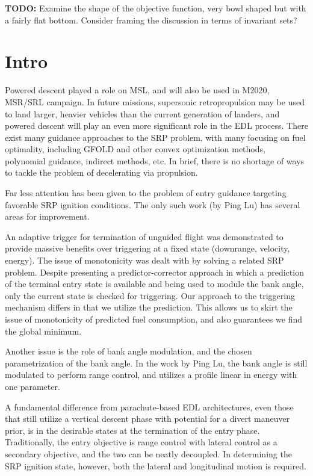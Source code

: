 \documentclass[]{article}
\begin{document}
\textbf{TODO:} Examine the shape of the objective function, very bowl shaped but with a fairly flat bottom. Consider framing the discussion in terms of invariant sets? 

\section{Intro}
Powered descent played a role on MSL, and will also be used in M2020, MSR/SRL campaign. In future missions, supersonic retropropulsion may be used to land larger, heavier vehicles than the current generation of landers, and powered descent will play an even more significant role in the EDL process. There exist many guidance approaches to the SRP problem, with many focusing on fuel optimality, including GFOLD and other convex optimization methods, polynomial guidance, indirect methods, etc. In brief, there is no shortage of ways to tackle the problem of decelerating via propulsion. 

Far less attention has been given to the problem of entry guidance targeting favorable SRP ignition conditions. The only such work (by Ping Lu) has several areas for improvement. 

An adaptive trigger for termination of unguided flight was demonstrated to provide massive benefits over triggering at a fixed state (downrange, velocity, energy). The issue of monotonicity was dealt with by solving a related SRP problem. Despite presenting a predictor-corrector approach in which a prediction of the terminal entry state is available and being used to module the bank angle, only the current state is checked for triggering. Our approach to the triggering mechanism differs in that we utilize the prediction. This allows us to skirt the issue of monotonicity of predicted fuel consumption, and also guarantees we find the global minimum. 

Another issue is the role of bank angle modulation, and the chosen parametrization of the bank angle. In the work by Ping Lu, the bank angle is still modulated to perform range control, and utilizes a profile linear in energy with one parameter. 

A fundamental difference from parachute-based EDL architectures, even those that still utilize a vertical descent phase with potential for a divert maneuver prior, is in the desirable states at the termination of the entry phase. Traditionally, the entry objective is range control with lateral control as a secondary objective, and the two can be neatly decoupled. In determining the SRP ignition state, however, both the lateral and longitudinal motion is required. 
\end{document}
